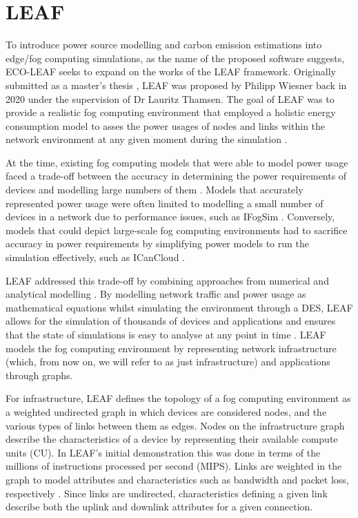 \documentclass{l4proj}
\begin{document}
\section{LEAF}\label{leaf}
To introduce power source modelling and carbon emission estimations into edge/fog computing simulations, as the name of the proposed software suggests, ECO-LEAF seeks to expand on the works of the  LEAF framework.
Originally submitted as a master's thesis \citep{leafMasters}, LEAF was proposed by Philipp Wiesner back in 2020 under the supervision of Dr Lauritz Thamsen.
The goal of LEAF was to provide a realistic fog computing environment that employed a holistic energy consumption model to asses the power usages of nodes and links within the network environment at any given moment during the simulation \citep{leafMasters}.

At the time, existing fog computing models that were able to model power usage faced a trade-off between the accuracy in determining the power requirements of devices and modelling large numbers of them \citep{leafMasters}.
Models that accurately represented power usage were often limited to modelling a small number of devices in a network due to performance issues, such as IFogSim \citep{IFOGSIM}.
Conversely, models that could depict large-scale fog computing environments had to sacrifice accuracy in power requirements by simplifying power models to run the simulation effectively, such as ICanCloud \citep{ICanCloud}.

LEAF addressed this trade-off by combining approaches from numerical and analytical modelling \citep{leafMasters}.
By modelling network traffic and power usage as mathematical equations whilst simulating the environment through a DES, LEAF allows for the simulation of thousands of devices and applications and ensures that the state of simulations is easy to analyse at any point in time \citep{leafMasters}.
LEAF models the fog computing environment by representing network infrastructure (which, from now on, we will refer to as just infrastructure) and applications through graphs.

For infrastructure, LEAF defines the topology of a fog computing environment as a weighted undirected graph in which devices are considered nodes, and the various types of links between them as edges.
Nodes on the infrastructure graph describe the characteristics of a device by representing their available compute units (CU).
In LEAF's initial demonstration this was done in terms of the millions of instructions processed per second (MIPS).
Links are weighted in the graph to model attributes and characteristics such as bandwidth and packet loss, respectively \citep{leaf2021}.
Since links are undirected, characteristics defining a given link describe both the uplink and downlink attributes for a given connection.
\end{document}
